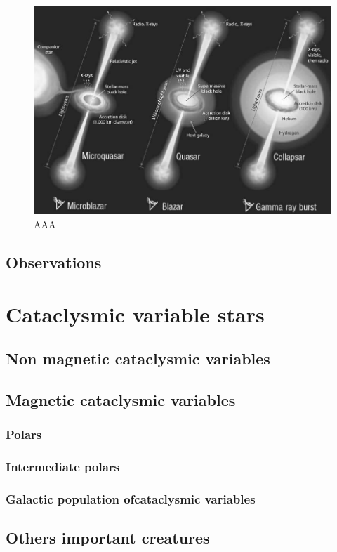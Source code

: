 \documentclass[oneside,a4paper,11pt]{report}
\begin{document}
\begin{figure}[!hbt]
\centering
\includegraphics[totalheight=8.5cm]{microblazars}
\caption{AAA \citet{mirabel:1}}
\label{microblazar} 
\end{figure}


\section{Observations}


\chapter{Cataclysmic variable stars}
\section{Non magnetic cataclysmic variables} 
\section{Magnetic cataclysmic variables}
\subsection{Polars}
\subsection{Intermediate polars}
\subsection{Galactic population ofcataclysmic variables }
\section{Others important creatures}
\end{document}
